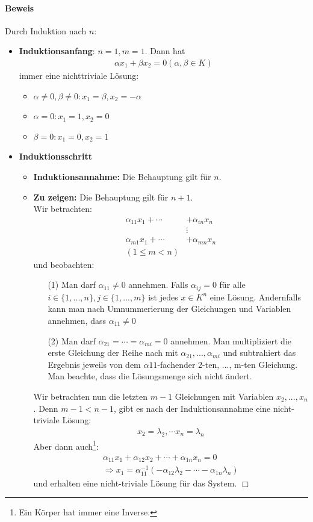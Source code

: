 \documentclass[11pt]{report}
\newcommand*\f[1] {\textbf{#1}}
\begin{document}
\paragraph{Beweis}
Durch Induktion nach $n$:
\begin{itemize}
 \item \f{Induktionsanfang}: $n=1, m=1$. Dann hat
\begin{align}
 \alpha x_1 + \beta x_2 = 0 (\alpha, \beta \in K)
\end{align}
immer eine nichttriviale Lösung:
\begin{itemize}
\item $\alpha \neq 0, \beta \neq 0: x_1= \beta, x_2 = -\alpha$
\item $\alpha = 0: x_1= 1, x_2 = 0$
\item $\beta = 0: x_1= 0, x_2 = 1$
\end{itemize}
\item \f{Induktionsschritt} 
\begin{itemize}
\item \f{Induktionsannahme:} Die Behauptung gilt für $n$.
\item \f{Zu zeigen:} Die Behauptung gilt für $n+1$.\\
Wir betrachten:
\begin{align}
 \alpha_{11} x_1 + \cdots &+ \alpha_{in} x_n \\
 &\vdots \\
 \alpha_{m1} x_1 + \cdots &+ \alpha_{mn} x_n \\
(1 \leq m < n)
\end{align}
und beobachten:
\begin{itemize}
\item[(1)] Man darf $\alpha_{11} \neq 0$ annehmen. Falls $\alpha_{ij}=0$ für alle $i \in \{1, ..., n\}, j \in \{1, ..., m\}$ ist jedes $x \in K^n$ eine Lösung. Andernfalls kann man nach Umnummerierung der Gleichungen und Variablen annehmen, dass $\alpha_{11} \neq 0$
\item[(2)] Man darf $\alpha_{21} = \cdots = \alpha_{mi} = 0$ annehmen. Man multipliziert die erste Gleichung der Reihe nach mit $\alpha_{21}, ..., \alpha_{mi}$ und subtrahiert das Ergebnis jeweils von dem $\alpha{11}$-fachender 2-ten, ..., m-ten Gleichung. Man beachte, dass die Lösungsmenge sich nicht ändert.
\end{itemize}
Wir betrachten nun die letzten $m-1$ Gleichungen mit Variablen $x_2, ..., x_n$. Denn $m-1 < n-1$, gibt es nach der Induktionsannahme eine nicht-triviale Lösung:
\begin{align}
 x_2 = \lambda_2, \cdots x_n = \lambda_n
\end{align}
Aber dann auch\footnote{Ein Körper hat immer eine Inverse.}:
\begin{align}
 \alpha_{11} x_1 + \alpha_{12} x_2 + \cdots + \alpha_{1n} x_n = 0 \\
 \Rightarrow x_1 = \alpha_{11}^{-1} (-\alpha_{12} \lambda_2 - \cdots - \alpha_{1n} \lambda_n)
\end{align}
und erhalten eine nicht-triviale Lösung für das System. \hfill $\Box$
\end{itemize}
\end{itemize}
\end{document}
